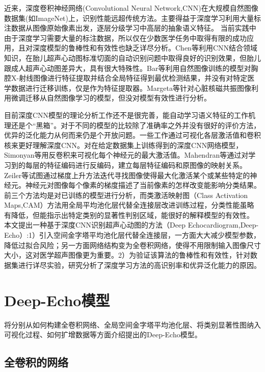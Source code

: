 近来，深度卷积神经网络(Convolutional Neural Network,CNN)在大规模自然图像数据集(如ImageNet\citep{Russakovsky})上，识别性能远超传统方法\citep{Krizhevsky2012}。主要得益于深度学习利用大量标注数据从图像原始像素出发，逐层分级学习中高层的抽象语义特征\citep{Sharif2014}。
当前实践中由于深度学习需要大量的标注数据，所以仅在少数医学任务中取得有限的成功应用，且对深度模型的鲁棒性和有效性也缺乏详尽分析。Chen等利用CNN结合领域知识，在胎儿超声心动图标准切面的自动识别问题中取得良好的识别效果，但胎儿跟成人超声心动图差异大，具有很大特殊性。Bar等\citep{Bar2015Chest}利用自然图像训练的模型对胸腔X-射线图像进行特征提取并结合全局特征\citep{Oliva2001}得到最优检测结果，并没有对特定医学数据进行迁移训练，仅是作为特征提取器。Margeta等\citep{Margeta2015}针对心脏核磁共振图像利用微调迁移从自然图像学习的模型，但没对模型有效性进行分析。

目前深度CNN模型的理论分析工作还不是很完善，能自动学习语义特征的工作机理还是个“黑箱”。对于不同的模型的比较除了准确率之外并没有很好的评价方法，优异的泛化能力从何而来仍是个开放问题。一些工作\citep{simonyan14deep,Mahendran2015,Zeiler2014,Zhou2015}通过可视化各层激活值和卷积核来更好理解深度CNN。对在给定数据集上训练得到的深度CNN网络模型，Simonyan等\citep{simonyan14deep}用反卷积来可视化每个神经元的最大激活值。Mahendran等\citep{Mahendran2015}通过对学习到的每层的特征编码进行反编码，建立每层特征编码和原图像的映射关系。Zeiler等\citep{Zeiler2014}试图通过梯度上升方法迭代寻找图像使得最大化激活某个或某些特定的神经元。神经元对图像每个像素的梯度描述了当前像素的怎样改变能影响分类结果。前三个方法均是对已训练的模型进行分析，而类激活映射图（Class Activation Maps,CAM）方法\citep{Zhou2015}用全局平均池化层代替全连接层改进训练过程，分类性能虽略有降低，但能指示出特定类别的显著性判别区域，能很好的解释模型的有效性。
本文提出一种基于深度CNN识别超声心动图的方法（Deep Echocardiogram,Deep-Echo）:1）引入空间金字塔平均池化层代替全连接层，一方面大大减少模型参数，降低过拟合风险；另一方面网络结构变为全卷积网络，使得不用限制输入图像尺寸大小，这对医学超声图像更为重要。2）为验证该算法的鲁棒性和有效性，针对数据集进行详尽实验，研究分析了深度学习方法的高识别率和优异泛化能力的原因。
 
\section{Deep-Echo模型}

将分别从如何构建全卷积网络、全局空间金字塔平均池化层、将类别显著性图纳入可视化过程、如何扩增数据等方面介绍提出的Deep-Echo模型。
\subsection{全卷积的网络}


